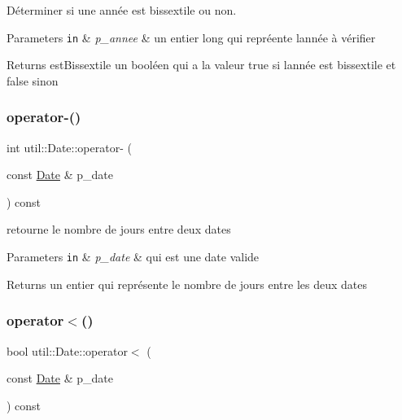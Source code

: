 Déterminer si une année est bissextile ou non. 


\begin{DoxyParams}[1]{Parameters}
\mbox{\tt in}  & {\em p\+\_\+annee} & un entier long qui repréente l\textquotesingle{}année à vérifier \\
\hline
\end{DoxyParams}
\begin{DoxyReturn}{Returns}
est\+Bissextile un booléen qui a la valeur true si l\textquotesingle{}année est bissextile et false sinon 
\end{DoxyReturn}
\mbox{\label{classutil_1_1Date_af12f2c545070b5e2b397be5379c5c3fd}} 
\subsubsection{\texorpdfstring{operator-\/()}{operator-()}}
{\footnotesize\ttfamily int util\+::\+Date\+::operator-\/ (\begin{DoxyParamCaption}\item[{const \hyperlink{classutil_1_1Date}{Date} \&}]{p\+\_\+date }\end{DoxyParamCaption}) const}



retourne le nombre de jours entre deux dates 


\begin{DoxyParams}[1]{Parameters}
\mbox{\tt in}  & {\em p\+\_\+date} & qui est une date valide \\
\hline
\end{DoxyParams}
\begin{DoxyReturn}{Returns}
un entier qui représente le nombre de jours entre les deux dates 
\end{DoxyReturn}
\mbox{\label{classutil_1_1Date_aefcf8a7520711f783fb0241d460480c5}} 
\subsubsection{\texorpdfstring{operator$<$()}{operator<()}}
{\footnotesize\ttfamily bool util\+::\+Date\+::operator$<$ (\begin{DoxyParamCaption}\item[{const \hyperlink{classutil_1_1Date}{Date} \&}]{p\+\_\+date }\end{DoxyParamCaption}) const}



